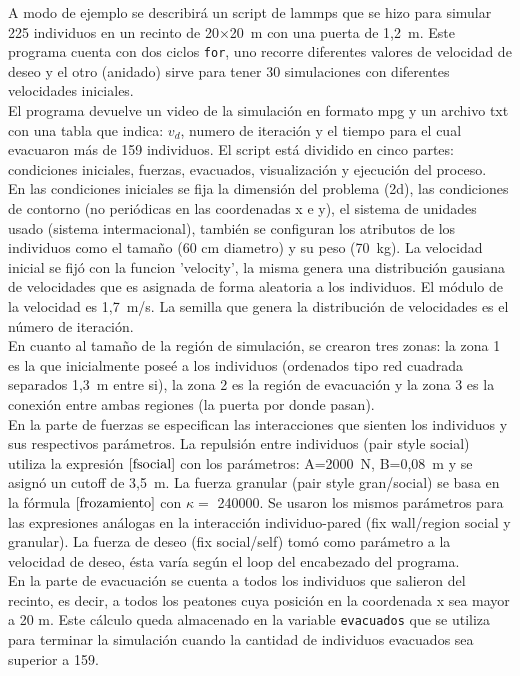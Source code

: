 A modo de ejemplo se describirá un script de lammps que se hizo para simular 225 individuos en un recinto de 20$\times$20~m con una puerta de 1,2~m. Este programa cuenta con dos ciclos {\tt for}, uno recorre diferentes valores de velocidad de deseo y el otro (anidado) sirve para tener 30 simulaciones con diferentes velocidades iniciales. \\
El programa devuelve un video de la simulación en formato mpg y un archivo txt con una tabla que indica: $v_d$, numero de iteración y el tiempo para el cual evacuaron más de 159 individuos.
El script está dividido en cinco partes: condiciones iniciales, fuerzas, evacuados, visualización y ejecución del proceso.\\ 
En las condiciones iniciales se fija la dimensión del problema (2d), las condiciones de contorno (no periódicas en las coordenadas x e y), el sistema de unidades usado (sistema intermacional), también se configuran los atributos de los individuos como el tamaño (60 cm diametro) y su peso (70~kg). La velocidad inicial se fijó con la funcion 'velocity', la misma genera una distribución gausiana de velocidades que es asignada de forma aleatoria a los individuos. El módulo de la velocidad es 1,7~m/s. La semilla que genera la distribución de velocidades es el número de iteración.\\
En cuanto al tamaño de la región de simulación, se crearon tres zonas: la zona 1 es la que inicialmente poseé a los individuos (ordenados tipo red cuadrada separados 1,3~m entre si), la zona 2 es la región de evacuación y la zona 3 es la conexión entre ambas regiones (la puerta por donde pasan).\\
En la parte de fuerzas se especifican las interacciones que sienten los individuos y sus respectivos parámetros. La repulsión entre individuos (pair style social) utiliza la expresión $\cite{fsocial}$ con los parámetros: A=2000~N, B=0,08~m y se asignó un cutoff de 3,5~m. La fuerza granular (pair style gran/social) se basa en la fórmula $\cite{frozamiento}$ con $\kappa =$ 240000. Se usaron los mismos parámetros para las expresiones análogas en la interacción individuo-pared (fix wall/region social y granular). La fuerza de deseo (fix social/self) tomó como parámetro a la velocidad de deseo, ésta varía según el loop del encabezado del programa. \\
En la parte de evacuación se cuenta a todos los individuos que salieron del recinto, es decir, a todos los peatones cuya posición en la coordenada x sea mayor a 20 m. Este cálculo queda almacenado en la variable {\tt evacuados} que se utiliza para terminar la simulación cuando la cantidad de individuos evacuados sea superior a 159. \\
